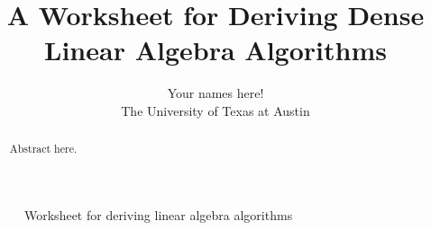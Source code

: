 \documentclass{article}
\title{
A Worksheet for Deriving
Dense Linear Algebra Algorithms
}
\author{
Your names here! \\
The University of Texas at Austin
}
\begin{document}
            
\maketitle

\begin{abstract} 
Abstract here.
\end{abstract}
            

\resetsteps

\begin{figure}[tbp]
\begin{center}
\worksheet
\end{center}
\caption{Worksheet for deriving linear algebra algorithms}
\end{figure}

\renewcommand{\operation}{B \becomes L^{-1} B}



\renewcommand{\precondition}{B = \hat{B} \wedge \cdots }


\renewcommand{\postcondition}{{ B = L^{-1} \hat{B} }}


\renewcommand{\invariant}{ 
\FlaTwoByOne{ B_T }
            { B_B } 
= 
\FlaTwoByOne{ L_{TL}^{-1} \hat{B}_T }
            { \hat{B}_B } 
}


\renewcommand{\guard}{ \neg \SameSize( L_{TL}, L ) }


\renewcommand{\partitionings}{
$
L \rightarrow
\FlaTwoByTwo{ L_{TL} } { 0 }
              { L_{BL} } { L_{BR}   }
$,
$
B \rightarrow 
\FlaTwoByOne{ B_T }
            { B_B }
$ and
$
\hat{B} \rightarrow 
\FlaTwoByOne{ \hat{B}_T }
            { \hat{B}_B }
$
}


\renewcommand{\partitionsizes}{$ L_{TL} $ is $ 0 \times 0 $, and ... }




\renewcommand{\repartitionings}{ 
\normalsize
$
\FlaTwoByTwo{ L_{TL} } { 0 }
              { L_{BL} } { L_{BR}   } \rightarrow
\FlaThreeByThreeBR{ L_{00} }{ 0 }{ 0 }
              { l_{10}^T }{ \lambda_{11} }{ 0 }
              { L_{20} }{ l_{21} }{ L_{22} }
$,
$
\FlaTwoByOne{ B_T }
            { B_B }
\rightarrow
\FlaThreeByOneB{ B_0 }
               { b_1^T }
               { B_2 }
$, and \\
$
\FlaTwoByOne{ \hat{B}_T }
            { \hat{B}_B }
\rightarrow
\FlaThreeByOneB{ \hat{B}_0 }
               { \hat{b}_1^T }
               { \hat{B}_2 }
$
}




\renewcommand{\repartitionsizes}{
$ b_1^T $ and $ \hat{b}_1^T $ are rows and $ \lambda_{11} $ is a scalar}
\end{document}
